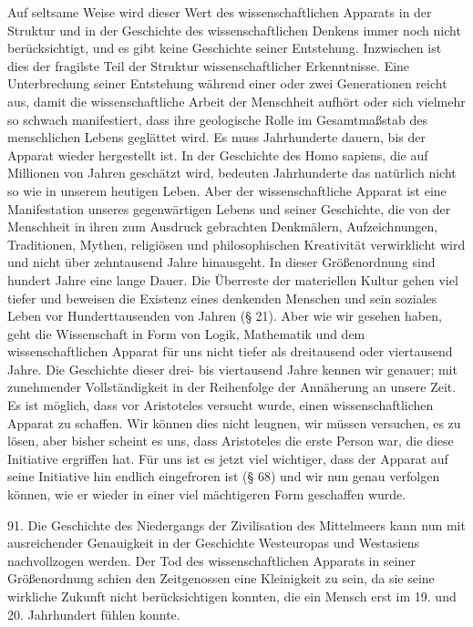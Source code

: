 \documentclass[11pt,a4paper]{book}
\begin{document}
Auf seltsame Weise wird dieser Wert des wissenschaftlichen Apparats in der
Struktur und in der Geschichte des wissenschaftlichen Denkens immer noch nicht
berücksichtigt, und es gibt keine Geschichte seiner Entstehung. Inzwischen ist
dies der fragilste Teil der Struktur wissenschaftlicher Erkenntnisse. Eine
Unterbrechung seiner Entstehung während einer oder zwei Generationen reicht
aus, damit die wissenschaftliche Arbeit der Menschheit aufhört oder sich
vielmehr so schwach manifestiert, dass ihre geologische Rolle im Gesamtmaßstab des menschlichen Lebens geglättet wird. Es muss Jahrhunderte dauern, bis der Apparat wieder hergestellt ist. In der Geschichte des Homo sapiens, die auf Millionen von Jahren geschätzt wird, bedeuten Jahrhunderte das natürlich nicht so wie in unserem heutigen Leben. Aber der wissenschaftliche Apparat ist eine Manifestation unseres gegenwärtigen Lebens und seiner Geschichte, die von der Menschheit in ihren zum Ausdruck gebrachten Denkmälern, Aufzeichnungen, Traditionen, Mythen, religiösen und philosophischen Kreativität verwirklicht wird und nicht über zehntausend Jahre hinausgeht. In dieser Größenordnung sind hundert Jahre eine lange Dauer. Die Überreste der materiellen Kultur gehen viel tiefer und beweisen die Existenz eines denkenden Menschen und sein soziales Leben vor Hunderttausenden von Jahren (§ 21). Aber wie wir gesehen haben, geht die Wissenschaft in Form von Logik, Mathematik und dem wissenschaftlichen Apparat für uns nicht tiefer als dreitausend oder viertausend Jahre. Die Geschichte dieser drei- bis viertausend Jahre kennen wir genauer; mit zunehmender Vollständigkeit in der Reihenfolge der Annäherung an unsere Zeit. Es ist möglich, dass vor Aristoteles versucht wurde, einen wissenschaftlichen Apparat zu schaffen. Wir können dies nicht leugnen, wir müssen versuchen, es zu lösen, aber bisher scheint es uns, dass Aristoteles die erste Person war, die diese Initiative ergriffen hat. Für uns ist es jetzt viel wichtiger, dass der Apparat auf seine Initiative hin endlich eingefroren ist (§ 68) und wir nun genau verfolgen können, wie er wieder in einer viel mächtigeren Form geschaffen wurde.



91. Die Geschichte des Niedergangs der Zivilisation des Mittelmeers kann nun mit ausreichender Genauigkeit in der Geschichte Westeuropas und Westasiens nachvollzogen werden. Der Tod des wissenschaftlichen Apparats in seiner Größenordnung schien den Zeitgenossen eine Kleinigkeit zu sein, da sie seine wirkliche Zukunft nicht berücksichtigen konnten, die ein Mensch erst im 19. und 20. Jahrhundert fühlen konnte.
\end{document}
